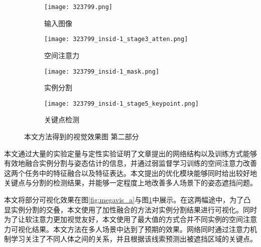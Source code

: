 \begin{figure}[htbp]
\begin{minipage}[t]{\linewidth}
		\vskip5pt
		\begin{subfigure}[b]{0.23\linewidth}
			\texttt{[image: 323799.png]}
			\caption{输入图像}
		\end{subfigure}
		\begin{subfigure}[b]{0.23\linewidth}
			\texttt{[image: 323799\_insid-1\_stage3\_atten.png]}
			\caption{空间注意力}
		\end{subfigure}
		\begin{subfigure}[b]{0.23\linewidth}
			\texttt{[image: 323799\_insid-1\_mask.png]}
			\caption{实例分割}
		\end{subfigure}
		\begin{subfigure}[b]{0.23\linewidth}
			\texttt{[image: 323799\_insid-1\_stage5\_keypoint.png]}
			\caption{关键点检测}
		\end{subfigure}
	\end{minipage}
	\caption{本文方法得到的视觉效果图 第二部分}
	\label{fig:megavis_b}
\end{figure}

本文通过大量的实验定量与定性实验证明了文章提出的网络结构以及训练方式能够有效地融合实例分割与姿态估计的信息，并通过弱监督学习训练的空间注意力改善这两个任务中的特征融合以及特征表达。本文提出的优化模块能够同时给出较好地关键点与分割的检测结果，并能够一定程度上地改善多人场景下的姿态遮挡问题。

本文将部分可视化效果在图\ref{fig:megavis_a}与图\ref{fig:megavis_b}中展示。在这两幅途中，为了凸显实例分割的交叠，本文使用了加性融合的方法对实例分割结果进行可视化。同时为了让软注意力更加视觉友好，本文使用了最大值的方式合并不同实例的空间注意力可视化结果。本文方法在多人场景中达到了预期的效果。网络同时通过注意力机制学习关注了不同人体之间的关系，并且根据该线索预测出被遮挡区域的关键点。

